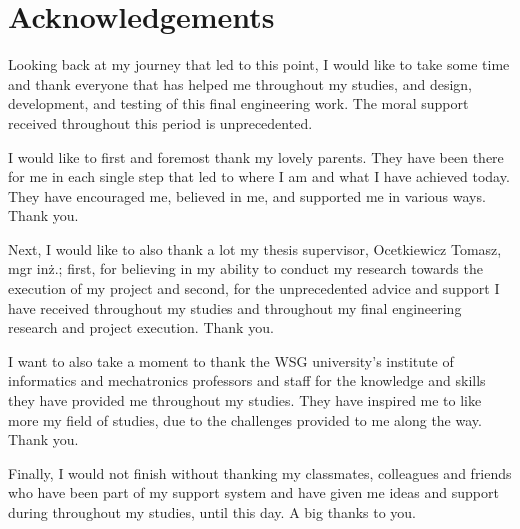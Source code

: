 \cleardoublepage

\section*{\centering \Large Acknowledgements}

\begin{acknowledgements}

    Looking back at my journey that led to this point, I would like to take some time and thank everyone that has helped me throughout my studies, and design, development, and testing of this final engineering work. The moral support received throughout this period is unprecedented.

    I would like to first and foremost thank my lovely parents. They have been there for me in each single step that led to where I am and what I have achieved today. They have encouraged me, believed in me, and supported me in various ways. Thank you.

    Next, I would like to also thank a lot my thesis supervisor, Ocetkiewicz Tomasz, mgr inż.; first, for believing in my ability to conduct my research towards the execution of my project and second, for the unprecedented advice and support I have received throughout my studies and throughout my final engineering research and project execution. Thank you.

    I want to also take a moment to thank the WSG university’s institute of informatics and mechatronics professors and staff for the knowledge and skills they have provided me throughout my studies. They have inspired me to like more my field of studies, due to the challenges provided to me along the way. Thank you.

    Finally, I would not finish without thanking my classmates, colleagues and friends who have been part of my support system and have given me ideas and support during throughout my studies, until this day. A big thanks to you.


\end{acknowledgements}

